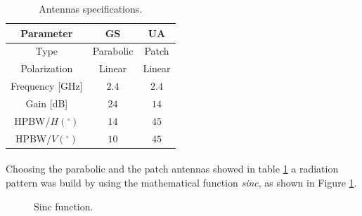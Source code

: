 \begin{table}[h]
	\centering
	\begin{tabular}{|c||c|c|}
		\hline
		Parameter & GS & UA\\ \hline\hline
		Type & Parabolic & Patch\\ \hline
		Polarization & Linear & Linear\\ \hline
		Frequency [GHz] & $2.4$ & $2.4$\\ \hline
		Gain [dB] & $24$ & $14$\\ \hline
		HPBW/$H(^{\circ})$ & $14$ & $45$\\ \hline
		HPBW/$V(^{\circ})$ & $10$ & $45$\\ \hline
	\end{tabular}
	\caption{Antennas specifications.}
	\label{table:1}
\end{table}

\paragraph{}Choosing the parabolic and the patch antennas showed in table \ref{table:1} a radiation pattern was build by using the mathematical function \textit{sinc}, as shown in Figure \ref{fig:sinc}.

\begin{figure}[H]
\hfill
{}
\hfill
{}
\hfill
\caption{Sinc function.}
\label{fig:sinc}
\end{figure}

